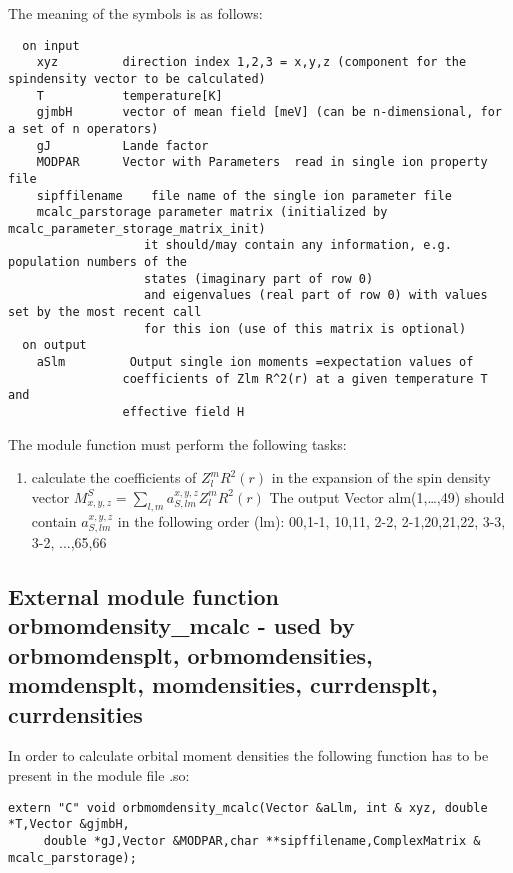 The meaning of the symbols is as follows:
{\footnotesize
\begin{verbatim}
  on input
    xyz         direction index 1,2,3 = x,y,z (component for the spindensity vector to be calculated)
    T           temperature[K]
    gjmbH       vector of mean field [meV] (can be n-dimensional, for a set of n operators)
    gJ          Lande factor
    MODPAR      Vector with Parameters  read in single ion property file
    sipffilename    file name of the single ion parameter file
    mcalc_parstorage parameter matrix (initialized by mcalc_parameter_storage_matrix_init)
                   it should/may contain any information, e.g. population numbers of the
				   states (imaginary part of row 0)
                   and eigenvalues (real part of row 0) with values set by the most recent call
                   for this ion (use of this matrix is optional)
  on output
    aSlm         Output single ion moments =expectation values of
                coefficients of Zlm R^2(r) at a given temperature T and
                effective field H
\end{verbatim}
}

The module function must perform the following tasks:
\begin{enumerate}
\item calculate the coefficients of $Z_l^m R^2(r)$ in the expansion of
      the spin density vector $M^S_{x,y,z}=\sum_{l,m} a^{x,y,z}_{S,lm} Z_l^m R^2(r)$
      The output Vector alm(1,\dots,49) should contain  $a^{x,y,z}_{S,lm}$
      in the following order (lm):  00,1-1, 10,11, 2-2, 2-1,20,21,22, 3-3, 3-2, ...,65,66
\end{enumerate}

\subsection{External module function {\prg orbmomdensity\_mcalc} -
used by {\prg orbmomdensplt},
{\prg orbmomdensities},
{\prg momdensplt},
{\prg momdensities},
{\prg currdensplt},
{\prg currdensities}
}

In order to calculate orbital moment densities
the following function has to be
present in the module file {\prg *.so}:

\begin{verbatim}
extern "C" void orbmomdensity_mcalc(Vector &aLlm, int & xyz, double *T,Vector &gjmbH,
     double *gJ,Vector &MODPAR,char **sipffilename,ComplexMatrix & mcalc_parstorage);
\end{verbatim}

